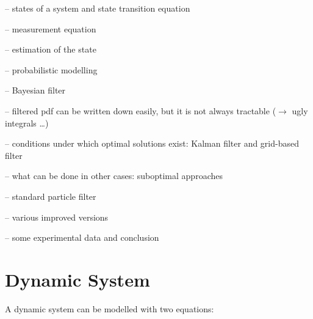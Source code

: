 \documentclass[english,pdftex]{article}
\begin{document}


\highlightnext
{}

-- states of a system and state transition equation

-- measurement equation


\highlightnext

-- estimation of the state

-- probabilistic modelling

-- Bayesian filter


\highlightnext

-- filtered pdf can be written down easily, but it is not always
tractable ($\rightarrow$ ugly integrals \dots)

-- conditions under which optimal solutions exist: Kalman filter
and grid-based filter

-- what can be done in other cases: suboptimal approaches


\highlightnext

-- standard particle filter

-- various improved versions


\highlightnext

-- some experimental data and conclusion



\newpage
{}


\section{Dynamic System}

A dynamic system can be modelled with two equations:
\end{document}
